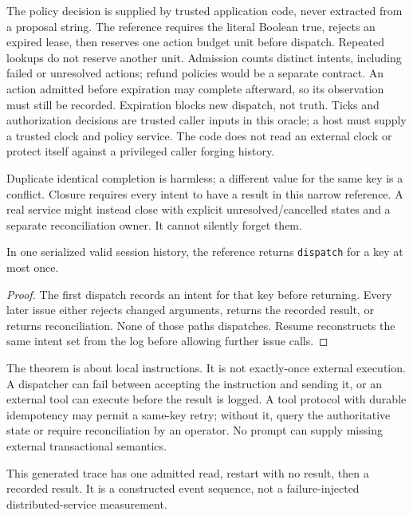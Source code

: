 The policy decision is supplied by trusted application code, never extracted
from a proposal string. The reference requires the literal Boolean true,
rejects an expired lease, then reserves one action budget unit before dispatch.
Repeated lookups do not reserve another unit. Admission counts distinct intents,
including failed or unresolved actions; refund policies would be a separate
contract. An action admitted before expiration may complete afterward, so its
observation must still be recorded. Expiration blocks new dispatch, not truth.
Ticks and authorization decisions are trusted caller inputs in this oracle;
a host must supply a trusted clock and policy service. The code does not read
an external clock or protect itself against a privileged caller forging history.

Duplicate identical completion is harmless; a different value for the same key
is a conflict. Closure requires every intent to have a result in this narrow
reference. A real service might instead close with explicit unresolved/cancelled
states and a separate reconciliation owner. It cannot silently forget them.

\begin{proposition}
In one serialized valid session history, the reference returns
\texttt{dispatch} for a key at most once.
\end{proposition}
\begin{proof}
The first dispatch records an intent for that key before returning. Every
later issue either rejects changed arguments, returns the recorded result,
or returns reconciliation. None of those paths dispatches. Resume reconstructs
the same intent set from the log before allowing further issue calls.
\end{proof}
The theorem is about local instructions. It is not exactly-once external
execution. A dispatcher can fail between accepting the instruction and sending
it, or an external tool can execute before the result is logged. A tool protocol
with durable idempotency may permit a same-key retry; without it, query the
authoritative state or require reconciliation by an operator. No prompt can
supply missing external transactional semantics.

\begin{center}\end{center}
This generated trace has one admitted read, restart with no result, then a
recorded result. It is a constructed event sequence, not a failure-injected
distributed-service measurement.

